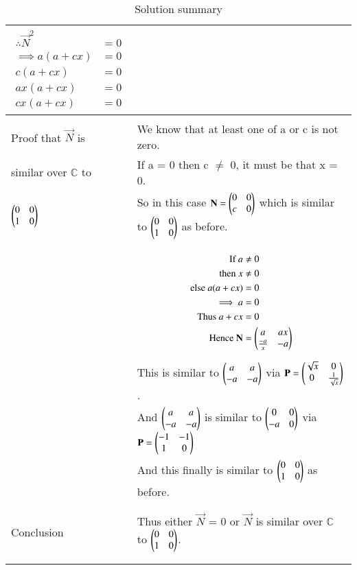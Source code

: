 \documentclass[journal,12pt]{IEEEtran}
\begin{document}
\begin{longtable}{|l|l|}
{\begin{align}
\therefore \vec{N}^2&=0\\
\implies a(a+cx)&=0\\
c(a+cx)&=0\\
ax(a+cx)&=0\\
cx(a+cx)&=0
\end{align}}\\
\hline
&\\
Proof that $\vec{N}$ is&We know that at least one of a or c is not zero.\\
similar over $\mathbb{C}$ to&If a = 0 then c $\neq$ 0, it must be that x = 0.\\
$\begin{pmatrix}0&0\\1&0\end{pmatrix}$&So in this case $\mathbf{N}=\begin{pmatrix}0&0\\c&0\end{pmatrix}$ which is similar to $\begin{pmatrix}0&0\\1&0\end{pmatrix}$ as before.\\
&\\
&\parbox{6cm}{\begin{align}
\mbox{If } a &\neq0\\
\mbox{then }x &\neq0\\
\mbox{else }a(a+cx)&=0\\
\implies a&=0\\
\mbox{Thus }a+cx&=0\\
\mbox{Hence }\mathbf{N}&=\begin{pmatrix}a&ax\\ \frac{-a}{x}&-a\end{pmatrix}
\end{align}}\\
 &This is similar to $\begin{pmatrix}a&a\\-a&-a\end{pmatrix}$ via $\mathbf{P}=\begin{pmatrix}\sqrt{x}&0\\0&\frac{1}{\sqrt{x}}\end{pmatrix}$.\\
 &And $\begin{pmatrix}a&a\\-a&-a\end{pmatrix}$ is similar to $\begin{pmatrix}0&0\\-a&0\end{pmatrix}$ via $\mathbf{P}=\begin{pmatrix}-1&-1\\1&0\end{pmatrix}$\\
 &And this finally is similar to $\begin{pmatrix}0&0\\1&0\end{pmatrix}$ as before.\\
 &\\
\hline
&\\
Conclusion &Thus either $\vec{N}$ = 0 or $\vec{N}$ is similar over $\mathbb{C}$ to $\begin{pmatrix}0&0\\1&0\end{pmatrix}$.\\
&\\
\hline
\caption{Solution summary}
\label{table:1}
\end{longtable}
\end{document}

